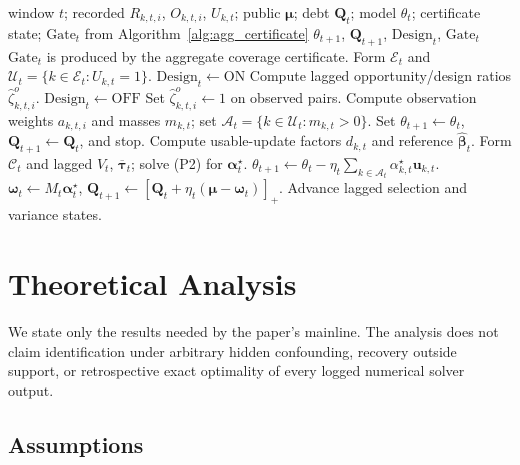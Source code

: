 \documentclass[letterpaper,journal]{IEEEtran}
\begin{document}
\begin{algorithm}[t]
\caption{Window-close RAVEN-MCS aggregation with aggregate coverage Gate}
\label{alg:window_close}
\begin{algorithmic}[1]
\REQUIRE window $t$; recorded $R_{k,t,i}$, $O_{k,t,i}$, $U_{k,t}$;
public $\boldsymbol\mu$; debt $\mathbf{Q}_t$; model $\theta_t$;
certificate state; $\mathrm{Gate}_t$ from Algorithm~\ref{alg:agg_certificate}
\ENSURE $\theta_{t+1}$, $\mathbf{Q}_{t+1}$, $\mathrm{Design}_t$, $\mathrm{Gate}_t$
\STATE $\mathrm{Gate}_t$ is produced by the aggregate coverage certificate.
\STATE Form $\mathcal{E}_t$ and
$\mathcal{U}_t=\{k\in\mathcal{E}_t:U_{k,t}=1\}$.
\STATE $\mathrm{Design}_t\leftarrow\mathrm{ON}$
\STATE Compute lagged opportunity/design ratios
$\widehat\zeta^{o}_{k,t,i}$.
\ELSE
\STATE $\mathrm{Design}_t\leftarrow\mathrm{OFF}$
\STATE Set $\widehat\zeta^{o}_{k,t,i}\leftarrow 1$ on observed pairs.
\ENDIF
\STATE Compute observation weights $a_{k,t,i}$ and masses $m_{k,t}$;
set $\mathcal{A}_t=\{k\in\mathcal{U}_t:m_{k,t}>0\}$.
\STATE Set $\theta_{t+1}\leftarrow\theta_t$,
$\mathbf{Q}_{t+1}\leftarrow\mathbf{Q}_t$, and stop.
\ELSE
\STATE Compute usable-update factors $d_{k,t}$ and reference
$\widehat{\boldsymbol\beta}_t$.
\STATE Form $\mathcal{C}_t$ and lagged $V_t$,
$\overline{\boldsymbol\tau}_t$; solve (P2) for
$\boldsymbol\alpha_t^\star$.
\STATE $\theta_{t+1}\leftarrow\theta_t
-\eta_t\sum_{k\in\mathcal{A}_t}\alpha^\star_{k,t}\mathbf{u}_{k,t}$.
\STATE $\boldsymbol\omega_t\leftarrow M_t\boldsymbol\alpha_t^\star$,
$\mathbf{Q}_{t+1}\leftarrow
[\mathbf{Q}_t+\eta_t(\boldsymbol\mu-\boldsymbol\omega_t)]_+$.
\STATE Advance lagged selection and variance states.
\ENDIF
\end{algorithmic}
\end{algorithm}


\section{Theoretical Analysis}
\label{sec:theory}

We state only the results needed by the paper's mainline.  The analysis does not
claim identification under arbitrary hidden confounding, recovery outside
support, or retrospective exact optimality of every logged numerical solver
output.

\subsection{Assumptions}
\label{subsec:assumptions}
\end{document}
